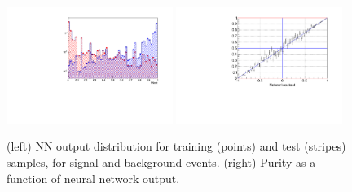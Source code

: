 \begin{figure}
\centering
\includegraphics[width=0.48\textwidth]{Lmumu/figs/TrainAndTest.pdf}
\includegraphics[width=0.48\textwidth]{Lmumu/figs/purity_NN.pdf}
\caption{(left) NN output distribution for training (points) and test (stripes) samples,
for signal and background events. (right) Purity as a function of neural network output.}
\label{fig:Lb_nnDist}
\end{figure}


